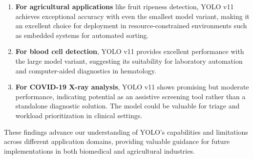 \begin{multicols}{2}
\begin{enumerate}
    \item \textbf{For agricultural applications} like fruit ripeness detection, YOLO v11 achieves exceptional accuracy with even the smallest model variant, making it an excellent choice for deployment in resource-constrained environments such as embedded systems for automated sorting.
    
    \item \textbf{For blood cell detection}, YOLO v11 provides excellent performance with the large model variant, suggesting its suitability for laboratory automation and computer-aided diagnostics in hematology.
    
    \item \textbf{For COVID-19 X-ray analysis}, YOLO v11 shows promising but moderate performance, indicating potential as an assistive screening tool rather than a standalone diagnostic solution. The model could be valuable for triage and workload prioritization in clinical settings.
\end{enumerate}

These findings advance our understanding of YOLO's capabilities and limitations across different application domains, providing valuable guidance for future implementations in both biomedical and agricultural industries.
\end{multicols}
